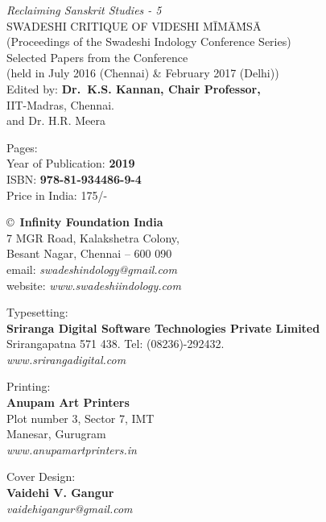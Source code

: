 \thispagestyle{empty}

\noindent
{\fontsize{9}{11}\selectfont\sl Reclaiming Sanskrit Studies - 5}\\
SWADESHI CRITIQUE OF VIDESHI MĪMĀṀSĀ\\
(Proceedings of the Swadeshi Indology Conference Series)\\
Selected Papers from the Conference\\
(held in July 2016 (Chennai) \& February 2017 (Delhi))\\
Edited by: {\bf Dr.\ K.S. Kannan, Chair Professor,}\\
IIT-Madras, Chennai.\\
and Dr. H.R. Meera
\vfill

\noindent
Pages: {\bf\pageref{bookend}}\\
Year of Publication: {\bf 2019}\\
ISBN: {\bf 978-81-934486-9-4}\\
Price in India: 175/-
\vfill

\noindent
\copyright\ {\bf Infinity Foundation India}\\ 
7 MGR Road, Kalakshetra Colony,\\ 
Besant Nagar, Chennai -- 600 090\\
email: {\sl swadeshindology@gmail.com}\\
website: {\sl www.swadeshiindology.com} 
\vfill

\noindent
Typesetting:\\ 
{\bf Sriranga Digital Software Technologies Private Limited}\\ 
Srirangapatna 571 438. Tel: (08236)-292432.\\
{\sl www.srirangadigital.com}
\vfill

\noindent
Printing:\\
{\bf Anupam Art Printers}\\
Plot number 3, Sector 7, IMT\\
Manesar, Gurugram\\
{\sl www.anupamartprinters.in}
\bigskip

\noindent
Cover Design:\\ 
{\bf Vaidehi V. Gangur}\\
{\sl vaidehigangur@gmail.com}
